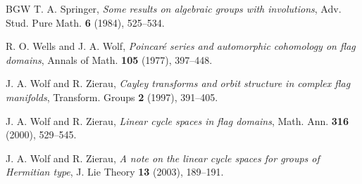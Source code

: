 \documentclass[12pt,a4paper]{amsart}
\theoremstyle{definition}
\theoremstyle{remark}
\numberwithin{equation}{section}
\begin{document}
\begin{thebibliography}{BGW}
T. A. Springer,
\textit{Some results on algebraic groups with involutions},
Adv. Stud. Pure Math. \textbf{6} (1984), 525--534.

R. O. Wells and J. A. Wolf,
\textit{Poincar{\'e} series and automorphic cohomology on flag domains},
Annals of Math. \textbf{105} (1977), 397--448.

J. A. Wolf and R. Zierau,
\textit{Cayley transforms and orbit structure in complex flag manifolds},
Transform. Groups \textbf{2} (1997), 391--405.

J. A. Wolf and R. Zierau,
\textit{Linear cycle spaces in flag domains},
Math. Ann. \textbf{316} (2000), 529--545.

J. A. Wolf and R. Zierau,
\textit{A note on the linear cycle spaces for groups of Hermitian type},
J. Lie Theory \textbf{13} (2003), 189--191.

\end{thebibliography}
\end{document}
